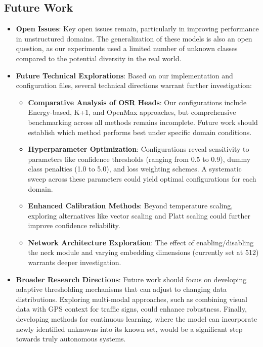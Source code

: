 \documentclass[11pt, a4paper]{article}
\begin{document}
\subsection{Future Work}
\begin{itemize}
    \item \textbf{Open Issues}: Key open issues remain, particularly in improving performance in unstructured domains. The generalization of these models is also an open question, as our experiments used a limited number of unknown classes compared to the potential diversity in the real world.
    
    \item \textbf{Future Technical Explorations}: Based on our implementation and configuration files, several technical directions warrant further investigation:
    \begin{itemize}
        \item \textbf{Comparative Analysis of OSR Heads}: Our configurations include Energy-based, K+1, and OpenMax approaches, but comprehensive benchmarking across all methods remains incomplete. Future work should establish which method performs best under specific domain conditions.
        
        \item \textbf{Hyperparameter Optimization}: Configurations reveal sensitivity to parameters like confidence thresholds (ranging from 0.5 to 0.9), dummy class penalties (1.0 to 5.0), and loss weighting schemes. A systematic sweep across these parameters could yield optimal configurations for each domain.
        
        \item \textbf{Enhanced Calibration Methods}: Beyond temperature scaling, exploring alternatives like vector scaling and Platt scaling could further improve confidence reliability.
        
        \item \textbf{Network Architecture Exploration}: The effect of enabling/disabling the neck module and varying embedding dimensions (currently set at 512) warrants deeper investigation.
    \end{itemize}
    
    \item \textbf{Broader Research Directions}: Future work should focus on developing adaptive thresholding mechanisms that can adjust to changing data distributions. Exploring multi-modal approaches, such as combining visual data with GPS context for traffic signs, could enhance robustness. Finally, developing methods for continuous learning, where the model can incorporate newly identified unknowns into its known set, would be a significant step towards truly autonomous systems.
\end{itemize}
\end{document}
